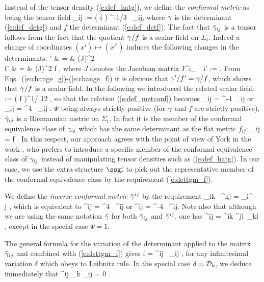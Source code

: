 Instead of the tensor density (\ref{e:def_hatg}), we define
the {\em conformal metric} as being the tensor field
\be \label{e:def_metconf}
	\tgm_{ij} := \left( {\gm\over f} \right) ^{-1/3} \, \gm_{ij},
\ee
where $\gamma$ is the determinant (\ref{e:def_detg}) and $f$
the determinant (\ref{e:def_detf}).
The fact that $\tilde\gamma_{ij}$ is a tensor follows from the fact
that the quotient $\gamma/f$ is a scalar field on $\Sigma_t$. Indeed
a change of coordinates $(x^i) \mapsto (x^{i'})$ induces the following
changes in the determinants:
\bea
	\gm'  & = & (\det J)^2 \gm \label{e:change_g} \\
	f' & = & (\det J)^2 f ,\label{e:change_f}
\eea
where $J$ denotes the Jacobian matrix
\be
	J^i_{\ \, i'} :=  .
\ee
From Eqs.~(\ref{e:change_g})-(\ref{e:change_f}) it is obvious
that $\gamma'/f' = \gamma /f$, which shows that $\gamma/f$ is a scalar field. 
In the following we introduced the related scalar field:
\be
	\Psi := \left( {\gm\over f} \right)^{1/ 12} ,
\ee
so that the relation (\ref{e:def_metconf}) becomes
\be \label{e:def_tgm2}
	\tgm_{ij} = \Psi^{-4}\, \gm_{ij}
	\qquad \mbox{or} \qquad \gm_{ij} = \Psi^4 \, \tgm_{ij} .
\ee
$\Psi$ being always strictly positive (for $\gamma$ and $f$ are 
strictly positive), $\tilde\gamma_{ij}$ is a Riemannian metric on $\Sigma_t$.
In fact it is the member of the conformal equivalence class of $\gamma_{ij}$
which has the same determinant as the flat metric $f_{ij}$:
\be \label{e:dettgm_f}
	\det \tgm_{ij} = f .
\ee
In this respect, our approach agrees with the point of view of York in the
work \cite{York99}, who prefers to introduce a specific member of
the conformal equivalence class of $\gamma_{ij}$ instead of manipulating
tensor densities such as (\ref{e:def_hatg}). In our case, we 
use the extra-structure $\w{f}$ to pick out
the representative member of the conformal equivalence class by the
requirement (\ref{e:dettgm_f}).

We define the {\em inverse conformal metric} $\tilde\gamma^{ij}$ by
the requirement
\be
	\tgm_{ik} \, \tgm^{kj} = \delta_i^{\ \, j} ,
\ee
which is equivalent to
\be
	\tgm^{ij}  = \Psi^4 \, \gm^{ij} \qquad \mbox{or} \qquad 
	\gm^{ij}  = \Psi^{-4} \, \tgm^{ij}.
\ee
Note also that although we are using the same notation $\tilde\gamma$
for both $\tilde\gamma_{ij}$ and $\tilde\gamma^{ij}$, one has
\be
	\tgm^{ij} \not= \gm^{ik} \gm^{jl}\, \tgm_{kl} ,
\ee
except in the special case $\Psi=1$.

The general formula for the variation of the determinant applied
to the matrix $\tilde\gamma_{ij}$ and combined with (\ref{e:dettgm_f})
gives
\be \label{e:variation_tgm}
	\delta \ln f = \tgm^{ij} \, \delta \tgm_{ij} ,
\ee
for any infinitesimal variation $\delta$ which obeys to Leibnitz rule. 
In the special case $\delta = {\cal D}_k$, we deduce immediately that 
\be \label{e:variation_tgm2}
	\tgm^{ij} \cD_k \tgm_{ij} = 0 . 
\ee


